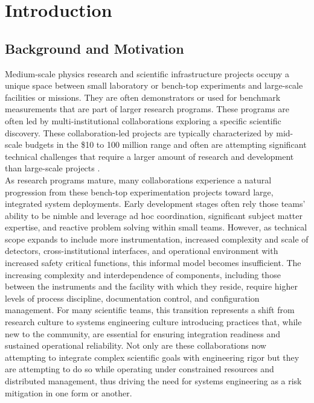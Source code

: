 \chapter{Introduction}
\label{chapter:intro}
\section{Background and Motivation}
\label{sect:background}
Medium-scale physics research and scientific infrastructure projects occupy a unique space between small laboratory or bench-top experiments and large-scale facilities or missions. 
They are often demonstrators or used for benchmark measurements that are part of larger research programs.
These programs are often led by multi-institutional collaborations exploring a specific scientific discovery. 
These collaboration-led projects are typically characterized by mid-scale budgets in the \$10 to 100 million range and often are attempting significant technical challenges that require a larger amount of research and development than large-scale projects \cite{pmScale2024}. \\
As research programs mature, many collaborations experience a natural progression from these bench-top experimentation projects toward large, integrated system deployments. 
Early development stages often rely those teams' ability to be nimble and leverage ad hoc coordination, significant subject matter expertise, and reactive problem solving within small teams. 
However, as technical scope expands to include more instrumentation, increased complexity and scale of detectors, cross-institutional interfaces, and operational environment with increased safety critical functions, this informal model becomes insufficient. 
The increasing complexity and interdependence of components, including those between the instruments and the facility with which they reside, require higher levels of process discipline, documentation control, and configuration management. 
For many scientific teams, this transition represents a shift from research culture to systems engineering culture introducing practices that, while new to the community, are essential for ensuring integration readiness and sustained operational reliability. 
Not only are these collaborations now attempting to integrate complex scientific goals with engineering rigor but they are attempting to do so while operating under constrained resources and distributed management, thus driving the need for systems engineering as a risk mitigation in one form or another. \\
